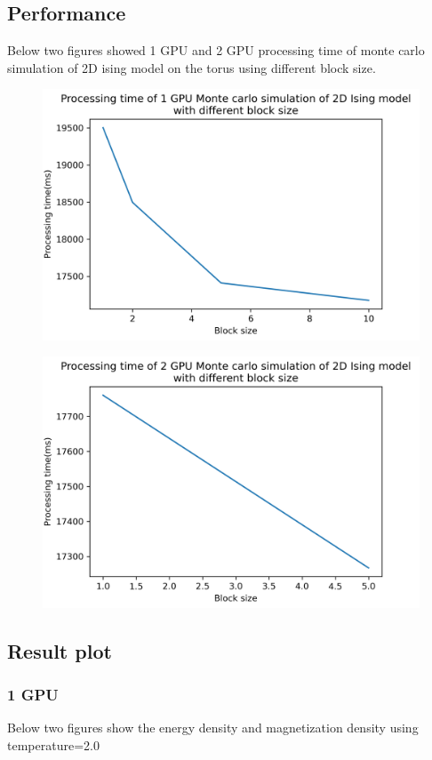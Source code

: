 \documentclass{article}
\begin{document}
	\subsection{Performance}
	Below two figures showed 1 GPU and 2 GPU processing time of monte carlo simulation of 2D ising model on the torus using different block size.
	\begin{figure}
		\centering
		\includegraphics[width=0.9\linewidth]{notebook/1gpu_block}
	\end{figure}
	\begin{figure}
		\centering
		\includegraphics[width=0.9\linewidth]{notebook/2gpu_block}
	\end{figure}
	\newpage
	
	\subsection{Result plot}
	\subsubsection{1 GPU}
	Below two figures show the energy density and magnetization density using temperature=2.0
\end{document}
